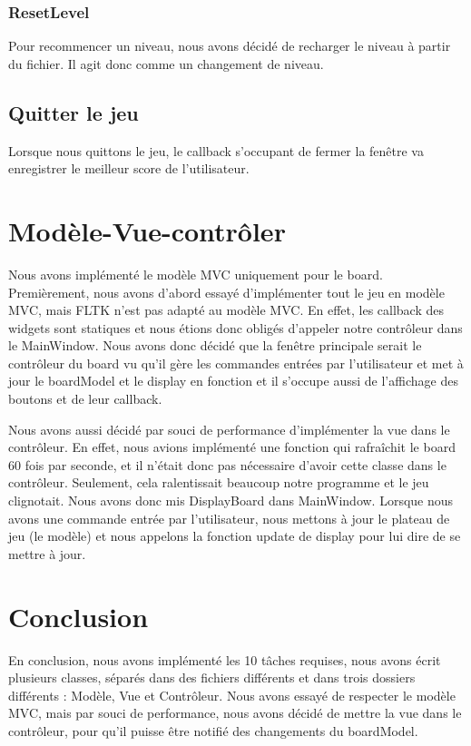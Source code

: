 \documentclass[utf8]{article}
\begin{document}
\begin{large}
\subsubsection{ResetLevel}
Pour recommencer un niveau, nous avons décidé de recharger le niveau à partir du
fichier. Il agit donc comme un changement de niveau.
\subsection{Quitter le jeu}
\indent
\par
Lorsque nous quittons le jeu, le callback s'occupant de fermer la fenêtre va
enregistrer le meilleur score de l'utilisateur.
\par

\section{Modèle-Vue-contrôler}
\indent
\par
Nous avons implémenté le modèle MVC uniquement pour le board. Premièrement, nous
avons d'abord essayé d'implémenter tout le jeu en modèle MVC, mais FLTK n'est
pas adapté au modèle MVC. En effet, les callback des widgets sont statiques et
nous étions donc obligés d'appeler notre contrôleur dans le MainWindow. Nous
avons donc décidé que la fenêtre principale serait le contrôleur du board vu
qu'il gère les commandes entrées par l'utilisateur et met à jour le boardModel
et le display en fonction et il s'occupe aussi de l'affichage des boutons et de
leur callback.
\par
Nous avons aussi décidé par souci de performance d'implémenter la vue dans le
contrôleur. En effet, nous avions implémenté une fonction qui rafraîchit le
board 60 fois par seconde, et il n'était donc pas nécessaire d'avoir cette
classe dans le contrôleur. Seulement, cela ralentissait beaucoup notre programme
et le jeu clignotait. Nous avons donc mis DisplayBoard dans MainWindow. Lorsque
nous avons une commande entrée par l'utilisateur, nous mettons à jour le plateau
de jeu (le modèle) et nous appelons la fonction update de display pour
lui dire de se mettre à jour. 
\par
\section{Conclusion}
\indent
\par
En conclusion, nous avons implémenté les 10 tâches requises, nous avons écrit
plusieurs classes, séparés dans des fichiers différents et dans trois dossiers
différents : Modèle, Vue et Contrôleur. Nous avons essayé de respecter le modèle
MVC, mais par souci de performance, nous avons décidé de mettre la vue dans le
contrôleur, pour qu'il puisse être notifié des changements du boardModel.
\par

\end{large}
\end{document}
